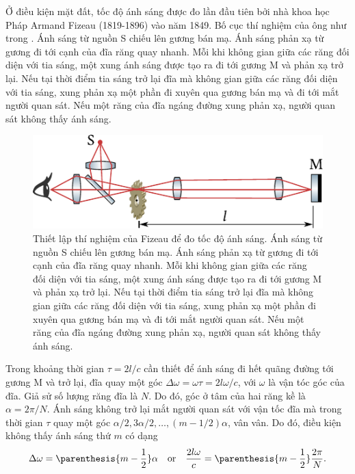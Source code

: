 Ở điều kiện mặt đất, tốc độ ánh sáng được đo lần đầu tiên bởi nhà khoa học Pháp Armand Fizeau (1819-1896) vào năm 1849.
Bố cục thí nghiệm của ông như trong .
Ánh sáng từ nguồn S chiếu lên gương bán mạ.
Ánh sáng phản xạ từ gương đi tới cạnh của đĩa răng quay nhanh.
Mỗi khi không gian giữa các răng đối diện với tia sáng, một xung ánh sáng được tạo ra đi tới gương M và phản xạ trở lại.
Nếu tại thời điểm tia sáng trở lại đĩa mà không gian giữa các răng đối diện với tia sáng, xung phản xạ một phần đi xuyên qua gương bán mạ và đi tới mắt người quan sát.
Nếu một răng của đĩa ngáng đường xung phản xạ, người quan sát không thấy ánh sáng.

\begin{figure}[!htb]
	\begin{center}
		\includegraphics[scale=1]{figures/ch_21/fig_21_2.pdf}
        \caption[]{Thiết lập thí nghiệm của Fizeau để đo tốc độ ánh sáng. Ánh sáng từ nguồn S chiếu lên gương bán mạ.
		Ánh sáng phản xạ từ gương đi tới cạnh của đĩa răng quay nhanh. Mỗi khi không gian giữa các răng đối diện với tia sáng, một xung ánh sáng được tạo ra đi tới gương M và phản xạ trở lại. Nếu tại thời điểm tia sáng trở lại đĩa mà không gian giữa các răng đối diện với tia sáng, xung phản xạ một phần đi xuyên qua gương bán mạ và đi tới mắt người quan sát.
		Nếu một răng của đĩa ngáng đường xung phản xạ, người quan sát không thấy ánh sáng.}
		\label{fig:21_2}
	\end{center}
	\vspace{-0.8cm}
\end{figure}

Trong khoảng thời gian $\tau=2l/c$ cần thiết để ánh sáng đi hết quãng đường tới gương M và trở lại, đĩa quay một góc $\Delta{\omega}=\omega\tau=2l\omega/c$, với $\omega$ là vận tóc góc của đĩa.
Giả sử số lượng răng đĩa là $N$.
Do đó, góc ở tâm của hai răng kề là $\alpha = 2\pi/N$.
Ánh sáng không trở lại mắt người quan sát với vận tốc đĩa mà trong thời gian $\tau$ quay một góc $\alpha/2, 3\alpha/2, \ldots, (m-1/2)\alpha$, vân vân.
Do đó, điều kiện không thấy ánh sáng thứ $m$ có dạng
\begin{equation*}
	\Delta{\omega} = \parenthesis{m - \frac{1}{2}} \alpha \quad \text{or} \quad \frac{2l\omega}{c} = \parenthesis{m - \frac{1}{2}} \frac{2\pi}{N}.
\end{equation*}

